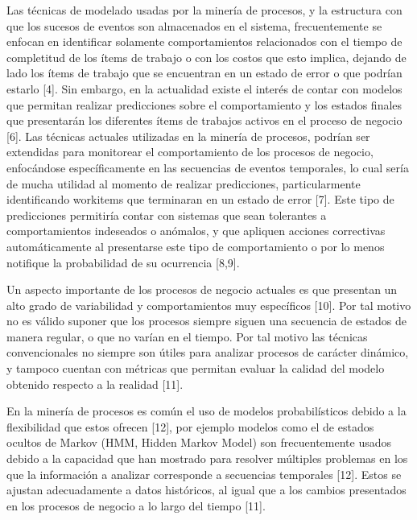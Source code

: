 Las técnicas de modelado usadas por la minería de procesos, y la estructura con que los sucesos de eventos son almacenados en el sistema, frecuentemente se enfocan en identificar solamente comportamientos relacionados con el tiempo de completitud de los ítems de trabajo o con los costos que esto implica, dejando de lado los ítems de trabajo que se encuentran en un estado de error o que podrían estarlo [4]. Sin embargo, en la actualidad existe el interés de contar con modelos que permitan realizar predicciones sobre el comportamiento y los estados finales que presentarán los diferentes ítems de trabajos activos en el proceso de negocio [6]. Las técnicas actuales utilizadas en la minería de procesos, podrían ser extendidas para monitorear el comportamiento de los procesos de negocio, enfocándose específicamente en las secuencias de eventos temporales, lo cual sería de mucha utilidad al momento de realizar predicciones, particularmente identificando workitems que terminaran en un estado de error [7]. Este tipo de predicciones permitiría contar con sistemas que sean tolerantes a comportamientos indeseados o anómalos, y que apliquen acciones correctivas automáticamente al presentarse este tipo de comportamiento o por lo menos notifique la probabilidad de su ocurrencia [8,9].

Un aspecto importante de los procesos de negocio actuales es que presentan un alto grado de variabilidad y comportamientos muy específicos [10]. Por tal motivo no es válido suponer que los procesos siempre siguen una secuencia de estados de manera regular, o que no varían en el tiempo. Por tal motivo las técnicas convencionales no siempre son útiles para analizar procesos de carácter dinámico, y tampoco cuentan con métricas que permitan evaluar la calidad del modelo obtenido respecto a la realidad [11].

En la minería de procesos es común el uso de modelos probabilísticos debido a la flexibilidad que estos ofrecen [12], por ejemplo modelos como el de estados ocultos de Markov (HMM, Hidden Markov Model) son frecuentemente usados debido a la capacidad que han mostrado para resolver múltiples problemas en los que la información a analizar corresponde a secuencias temporales [12]. Estos se ajustan adecuadamente a datos históricos, al igual que a los cambios presentados en los procesos de negocio a lo largo del tiempo [11].

